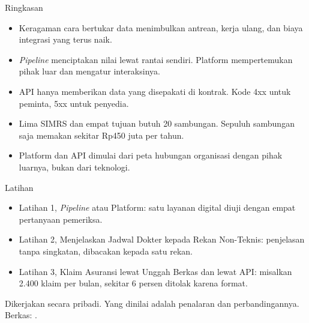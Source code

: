 \documentclass[aspectratio=169, table, 12pt]{beamer}
\begin{document}
\begin{frame}{{\Large Ringkasan}}
  \vspace{6pt}
  \begin{itemize}
    \item Keragaman cara bertukar data menimbulkan antrean, kerja ulang, dan biaya integrasi yang terus naik.
    \item \textit{Pipeline} menciptakan nilai lewat rantai sendiri. Platform mempertemukan pihak luar dan mengatur interaksinya.
    \item API hanya memberikan data yang disepakati di kontrak. Kode 4xx untuk peminta, 5xx untuk penyedia.
    \item Lima SIMRS dan empat tujuan butuh 20 sambungan. Sepuluh sambungan saja memakan sekitar Rp450 juta per tahun.
    \item Platform dan API dimulai dari peta hubungan organisasi dengan pihak luarnya, bukan dari teknologi.
  \end{itemize}
\end{frame}

\begin{frame}{{\Large Latihan}}
  \vspace{6pt}
  \begin{itemize}
    \item Latihan 1, \textit{Pipeline} atau Platform: satu layanan digital diuji dengan empat pertanyaan pemeriksa.
    \item Latihan 2, Menjelaskan Jadwal Dokter kepada Rekan Non-Teknis: penjelasan tanpa singkatan, dibacakan kepada satu rekan.
    \item Latihan 3, Klaim Asuransi lewat Unggah Berkas dan lewat API: misalkan 2.400 klaim per bulan, sekitar 6 persen ditolak karena format.
  \end{itemize}
  \vspace{6pt}
  {\small Dikerjakan secara pribadi. Yang dinilai adalah penalaran dan perbandingannya. Berkas: .\par}
\end{frame}
\end{document}
